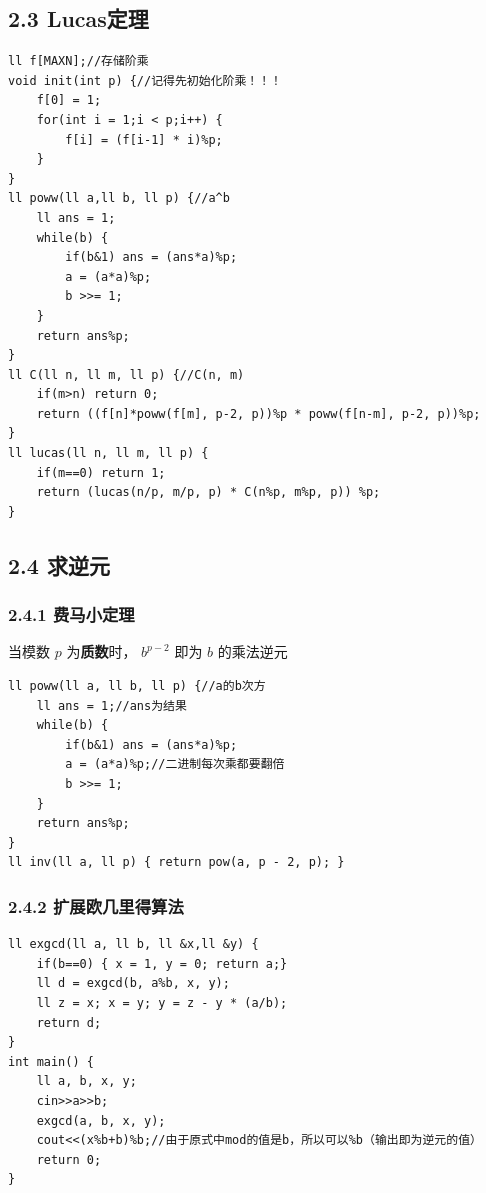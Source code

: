 \documentclass[11pt]{article}		%
\begin{document}
\subsection{2.3 Lucas定理}\label{lucasux5b9aux7406}

\begin{verbatim}
ll f[MAXN];//存储阶乘
void init(int p) {//记得先初始化阶乘！！！
    f[0] = 1;
    for(int i = 1;i < p;i++) {
        f[i] = (f[i-1] * i)%p;
    }
}
ll poww(ll a,ll b, ll p) {//a^b
    ll ans = 1;
    while(b) {
        if(b&1) ans = (ans*a)%p;
        a = (a*a)%p;
        b >>= 1;
    }
    return ans%p;
}
ll C(ll n, ll m, ll p) {//C(n, m)
    if(m>n) return 0;
    return ((f[n]*poww(f[m], p-2, p))%p * poww(f[n-m], p-2, p))%p;
}
ll lucas(ll n, ll m, ll p) {
    if(m==0) return 1;
    return (lucas(n/p, m/p, p) * C(n%p, m%p, p)) %p;
}
\end{verbatim}

\subsection{2.4 求逆元}\label{ux6c42ux9006ux5143}

\subsubsection{2.4.1 费马小定理}\label{ux8d39ux9a6cux5c0fux5b9aux7406}

当模数 \(p\) 为\textbf{质数}时， \(b^{p-2}\) 即为 \(b\) 的乘法逆元

\begin{verbatim}
ll poww(ll a, ll b, ll p) {//a的b次方
    ll ans = 1;//ans为结果
    while(b) {
        if(b&1) ans = (ans*a)%p;
        a = (a*a)%p;//二进制每次乘都要翻倍 
        b >>= 1;
    }
    return ans%p;   
}
ll inv(ll a, ll p) { return pow(a, p - 2, p); }
\end{verbatim}

\subsubsection{2.4.2
扩展欧几里得算法}\label{ux6269ux5c55ux6b27ux51e0ux91ccux5f97ux7b97ux6cd5}

\begin{verbatim}
ll exgcd(ll a, ll b, ll &x,ll &y) {
    if(b==0) { x = 1, y = 0; return a;}
    ll d = exgcd(b, a%b, x, y);
    ll z = x; x = y; y = z - y * (a/b);
    return d;
}
int main() {
    ll a, b, x, y;
    cin>>a>>b;
    exgcd(a, b, x, y);
    cout<<(x%b+b)%b;//由于原式中mod的值是b，所以可以%b（输出即为逆元的值）
    return 0;
}
\end{verbatim}
\end{document}
